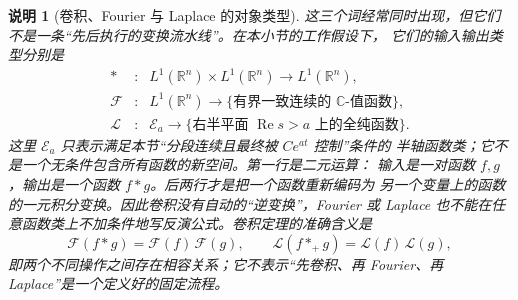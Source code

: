 \documentclass[UTF8,fontset=none,a4paper,11pt]{ctexart}
\theoremstyle{foundation-definition}
\theoremstyle{foundation-theorem}
\theoremstyle{foundation-proposition}
\theoremstyle{foundation-example}
\theoremstyle{foundation-remark}
\newtheorem{remark}[definition]{说明}
\theoremstyle{foundation-theorem}
\begin{document}
\begin{remark}[卷积、Fourier 与 Laplace 的对象类型]\label{rem:transform-type-boundary}
这三个词经常同时出现，但它们不是一条“先后执行的变换流水线”。在本小节的工作假设下，
它们的输入输出类型分别是
\[
\begin{array}{rcl}
 *&:&L^1(\mathbb R^n)\times L^1(\mathbb R^n)\longrightarrow L^1(\mathbb R^n),\\[2pt]
 \mathcal F&:&L^1(\mathbb R^n)\longrightarrow
 \{\text{有界一致连续的 }\mathbb C\text{-值函数}\},\\[2pt]
 \mathcal L&:&\mathcal E_a\longrightarrow
 \{\text{右半平面 }\operatorname{Re}s>a\text{ 上的全纯函数}\}.
\end{array}
\]
这里 \(\mathcal E_a\) 只表示满足本节“分段连续且最终被 \(Ce^{at}\) 控制”条件的
半轴函数类；它不是一个无条件包含所有函数的新空间。第一行是\emph{二元运算}：
输入是一对函数 \(f,g\)，输出是一个函数 \(f*g\)。后两行才是把一个函数重新编码为
另一个变量上的函数的\emph{一元积分变换}。因此卷积没有自动的“逆变换”，Fourier 或 Laplace
也不能在任意函数类上不加条件地写反演公式。卷积定理的准确含义是
\[
\mathcal F(f*g)=\mathcal F(f)\,\mathcal F(g),
\qquad
\mathcal L(f*_{+}g)=\mathcal L(f)\,\mathcal L(g),
\]
即两个不同操作之间存在相容关系；它不表示“先卷积、再 Fourier、再 Laplace”是一个定义好的固定流程。
\end{remark}
\end{document}
